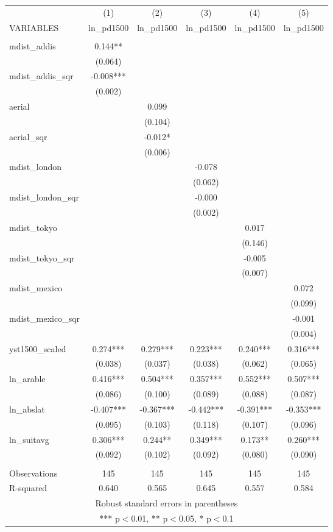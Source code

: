 \documentclass[]{article}
\begin{document}
\begin{tabular}{lccccc} \hline
 & (1) & (2) & (3) & (4) & (5) \\
VARIABLES & ln\_pd1500 & ln\_pd1500 & ln\_pd1500 & ln\_pd1500 & ln\_pd1500 \\ \hline
 &  &  &  &  &  \\
mdist\_addis & 0.144** &  &  &  &  \\
 & (0.064) &  &  &  &  \\
mdist\_addis\_sqr & -0.008*** &  &  &  &  \\
 & (0.002) &  &  &  &  \\
aerial &  & 0.099 &  &  &  \\
 &  & (0.104) &  &  &  \\
aerial\_sqr &  & -0.012* &  &  &  \\
 &  & (0.006) &  &  &  \\
mdist\_london &  &  & -0.078 &  &  \\
 &  &  & (0.062) &  &  \\
mdist\_london\_sqr &  &  & -0.000 &  &  \\
 &  &  & (0.002) &  &  \\
mdist\_tokyo &  &  &  & 0.017 &  \\
 &  &  &  & (0.146) &  \\
mdist\_tokyo\_sqr &  &  &  & -0.005 &  \\
 &  &  &  & (0.007) &  \\
mdist\_mexico &  &  &  &  & 0.072 \\
 &  &  &  &  & (0.099) \\
mdist\_mexico\_sqr &  &  &  &  & -0.001 \\
 &  &  &  &  & (0.004) \\
yst1500\_scaled & 0.274*** & 0.279*** & 0.223*** & 0.240*** & 0.316*** \\
 & (0.038) & (0.037) & (0.038) & (0.062) & (0.065) \\
ln\_arable & 0.416*** & 0.504*** & 0.357*** & 0.552*** & 0.507*** \\
 & (0.086) & (0.100) & (0.089) & (0.088) & (0.087) \\
ln\_abslat & -0.407*** & -0.367*** & -0.442*** & -0.391*** & -0.353*** \\
 & (0.095) & (0.103) & (0.118) & (0.107) & (0.096) \\
ln\_suitavg & 0.306*** & 0.244** & 0.349*** & 0.173** & 0.260*** \\
 & (0.092) & (0.102) & (0.092) & (0.080) & (0.090) \\
 &  &  &  &  &  \\
Observations & 145 & 145 & 145 & 145 & 145 \\
 R-squared & 0.640 & 0.565 & 0.645 & 0.557 & 0.584 \\ \hline
\multicolumn{6}{c}{ Robust standard errors in parentheses} \\
\multicolumn{6}{c}{ *** p$<$0.01, ** p$<$0.05, * p$<$0.1} \\
\end{tabular}
\end{document}

